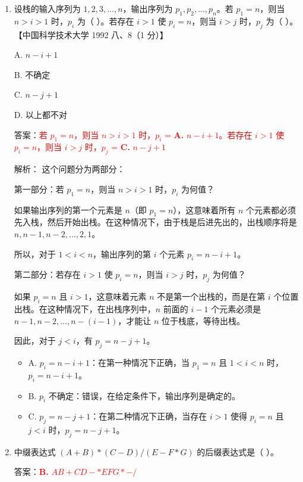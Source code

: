 \documentclass[lang=cn,newtx,10pt,scheme=chinese]{../../../elegantbook}
\begin{document}
\begin{enumerate}
    \item 设栈的输入序列为 $1, 2, 3, \ldots, n$，输出序列为 $p_1, p_2, \ldots, p_n$。若 $p_1 = n$，则当 $n > i > 1$ 时，$p_i$ 为（ ）。若存在 $i > 1$ 使 $p_i = n$，则当 $i > j$ 时，$p_j$ 为（ ）。  
    【中国科学技术大学 1992 八、8（1 分）】  

    A. $n - i + 1$  

    B. 不确定  

    C. $n - j + 1$  

    D. 以上都不对  

    答案：\textcolor{red}{若 $p_1 = n$，则当 $n > i > 1$ 时，$p_i$ = \textbf{A.} $n - i + 1$。若存在 $i > 1$ 使 $p_i = n$，则当 $i > j$ 时，$p_j$ = \textbf{C.} $n - j + 1$}

    解析：
    这个问题分为两部分：

    第一部分：若 $p_1 = n$，则当 $n > i > 1$ 时，$p_i$ 为何值？
    
    如果输出序列的第一个元素是 $n$（即 $p_1 = n$），这意味着所有 $n$ 个元素都必须先入栈，然后开始出栈。在这种情况下，由于栈是后进先出的，出栈顺序将是 $n, n-1, n-2, \ldots, 2, 1$。
    
    所以，对于 $1 < i < n$，输出序列的第 $i$ 个元素 $p_i = n - i + 1$。

    第二部分：若存在 $i > 1$ 使 $p_i = n$，则当 $i > j$ 时，$p_j$ 为何值？
    
    如果 $p_i = n$ 且 $i > 1$，这意味着元素 $n$ 不是第一个出栈的，而是在第 $i$ 个位置出栈。在这种情况下，在出栈序列中，$n$ 前面的 $i-1$ 个元素必须是 $n-1, n-2, \ldots, n-(i-1)$，才能让 $n$ 位于栈底，等待出栈。
    
    因此，对于 $j < i$，有 $p_j = n - j + 1$。

    \begin{itemize}
        \item A. $p_i = n - i + 1$：在第一种情况下正确，当 $p_1 = n$ 且 $1 < i < n$ 时，$p_i = n - i + 1$。
        \item B. $p_i$ 不确定：错误，在给定条件下，输出序列是确定的。
        \item C. $p_j = n - j + 1$：在第二种情况下正确，当存在 $i > 1$ 使得 $p_i = n$ 且 $j < i$ 时，$p_j = n - j + 1$。
    \end{itemize}

    \item 中缀表达式 $(A + B) * (C - D) / (E - F * G)$ 的后缀表达式是（ ）。  
   
    答案：\textcolor{red}{\textbf{B.} $AB+CD-*EFG*-/$}


\end{enumerate}
\end{document}
